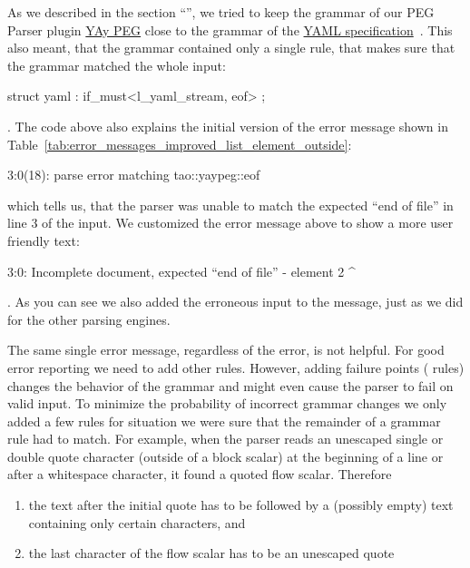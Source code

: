 As we described in the section “”, we tried to keep the grammar of our PEG Parser plugin \href{https://libelektra.org/plugins/yaypeg}{YAy PEG} close to the grammar of the \href{http://yaml.org/spec/1.2/spec}{YAML specification}~\cite{ben2009yaml}. This also meant, that the grammar contained only a single  rule, that makes sure that the grammar matched the whole input:

\begin{cppcode}
  struct yaml : if_must<l_yaml_stream, eof> {};
\end{cppcode}

. The code above also explains the initial version of the error message shown in Table~\ref{tab:error_messages_improved_list_element_outside}:

\begin{textcode}
  3:0(18): parse error matching tao::yaypeg::eof
\end{textcode}

which tells us, that the parser was unable to match the expected “end of file” in line 3 of the input. We customized the error message above to show a more user friendly text:

\begin{textcode}
  3:0: Incomplete document, expected “end of file”
       - element 2
       ^
\end{textcode}

. As you can see we also added the erroneous input to the message, just as we did for the other parsing engines.

The same single error message, regardless of the error, is not helpful. For good error reporting we need to add other  rules. However, adding failure points ( rules) changes the behavior of the grammar and might even cause the parser to fail on valid input. To minimize the probability of incorrect grammar changes we only added a few rules for situation we were sure that the remainder of a grammar rule had to match. For example, when the parser reads an unescaped single or double quote character (outside of a block scalar) at the beginning of a line or after a whitespace character, it found a quoted flow scalar. Therefore

\begin{enumerate}
  \item the text after the initial quote has to be followed by a (possibly empty) text containing only certain characters, and
  \item the last character of the flow scalar has to be an unescaped quote
\end{enumerate}

